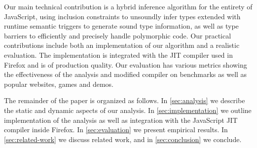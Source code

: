 Our main technical contribution is a hybrid inference algorithm for the
entirety of JavaScript, using inclusion constraints to unsoundly infer
types extended with runtime semantic triggers to generate sound type
information, as well as type barriers to efficiently and precisely handle
polymorphic code. Our practical contributions include both an
implementation of our algorithm and a realistic evaluation. The implementation
is integrated with the JIT compiler used in Firefox and is of production
quality. Our evaluation has various metrics showing the effectiveness of the
analysis and modified compiler on benchmarks as well as popular websites,
games and demos.








The remainder of the paper is organized as follows. In \Section\ref{sec:analysis}
we describe the static and dynamic aspects of our
analysis. In \Section\ref{sec:implementation} we outline implementation of the
analysis as well as integration with the JavaScript JIT compiler inside
Firefox. In \Section\ref{sec:evaluation} we present empirical
results. In \Section\ref{sec:related-work} we discuss related work, and in
\Section\ref{sec:conclusion} we conclude.


